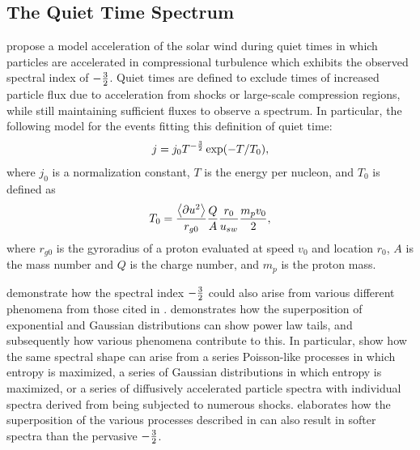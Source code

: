 \documentclass[letterpaper,11pt]{article}
\begin{document}

\subsection{The Quiet Time Spectrum}
\citet{Fisk2008} propose a model acceleration of the solar wind during quiet times in which particles are accelerated in compressional turbulence which exhibits the observed spectral index of $-{3 \over 2}$.  Quiet times are defined to exclude times of increased particle flux due to acceleration from shocks or large-scale compression regions, while still maintaining sufficient fluxes to observe a spectrum.  In particular, the following model for the events fitting this definition of quiet time:
\begin{equation}
j = j_0 T^{-{3 \over 2}} \exp(-T / T_0),
\label{eqn:flux}
\end{equation}
where $j_0$ is a normalization constant, $T$ is the energy per nucleon, and $T_0$ is defined as
\begin{equation}
T_0 = \frac{\left \langle \partial u^2 \right \rangle}{r_{g0}}{Q \over A}{r_0 \over u_{sw}}{m_p v_0 \over 2},
\end{equation}
where $r_{g0}$ is the gyroradius of a proton evaluated at speed $v_0$ and location $r_0$, $A$ is the mass number and $Q$ is the charge number, and $m_p$ is the proton mass.

\citet{Schwadron2010} demonstrate how the spectral index $-{3 \over 2}$ could also arise from various different phenomena from those cited in \citet{Fisk2008}.  \citet{Schwadron2010} demonstrates how the superposition of exponential and Gaussian distributions can show power law tails, and subsequently how various phenomena contribute to this.  In particular, \citet{Schwadron2010} show how the same spectral shape can arise from a series Poisson-like processes in which entropy is maximized, a series of Gaussian distributions in which entropy is maximized, or a series of diffusively accelerated particle spectra with individual spectra derived from being subjected to numerous shocks.  \citet{Schwadron2019AGU} elaborates how the superposition of the various processes described in \citet{Schwadron2010} can also result in softer spectra than the pervasive $-{3 \over 2}$.
\end{document}
